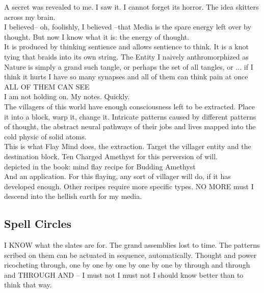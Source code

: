 \documentclass[12pt]{article}
\begin{document}
  
    A secret was revealed to me. I saw it. I cannot forget its horror. The idea skitters across my brain.\\I believed-- oh, foolishly, I believed --that Media is the spare energy left over by thought. But now I know what it is: the energy of thought.\\


  
    It is produced by thinking sentience and allows sentience to think. It is a knot tying that braids into its own string. The Entity I naively anthromorphized as Nature is simply a grand such tangle, or perhaps the set of all tangles, or ... if I think it hurts I have so many synapses and all of them can think pain at once ALL OF THEM CAN SEE\\I am not holding on. My notes. Quickly.\\


  
    The villagers of this world have enough consciousness left to be extracted. Place it into a block, warp it, change it. Intricate patterns caused by different patterns of thought, the abstract neural pathways of their jobs and lives mapped into the cold physic of solid atoms.\\This is what Flay Mind does, the extraction. Target the villager entity and the destination block. Ten Charged Amethyst for this perversion of will.\\


    depicted in the book: mind flay recipe for Budding Amethyst\\
  
  And an application. For this flaying, any sort of villager will do, if it has developed enough. Other recipes require more specific types. NO MORE must I descend into the hellish earth for my media.\\

\newpage

\label{sec:greatwork/spellcircles}
\subsection*{Spell Circles}


  
    I KNOW what the slates are for. The grand assemblies lost to time. The patterns scribed on them can be actuated in sequence, automatically. Thought and power ricocheting through, one by one by one by one by one by through and through and THROUGH AND -- I must not I must not I should know better than to think that way.\\
\end{document}
